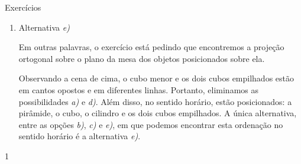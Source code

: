 \clearpage
\def\currentcolor{cor1}
\begin{answer}{Exercícios}
{\exerciselist
\begin{enumerate}
\item Alternativa \textit{e)}

Em outras palavras, o exercício está pedindo que encontremos a projeção ortogonal sobre o plano da mesa dos objetos posicionados sobre ela.

Observando a cena de cima, o cubo menor e os dois cubos empilhados estão em cantos opostos e em diferentes linhas. Portanto, eliminamos as possibilidades \textit{a)} e \textit{d)}. Além disso, no sentido horário, estão posicionados: a pirâmide, o cubo, o cilindro e os dois cubos empilhados. A única alternativa, entre as opções \textit{b)}, \textit{c)} e \textit{e)}, em que podemos encontrar esta ordenação no sentido horário é a alternativa \textit{e)}.
\end{enumerate}
}{1}
\end{answer}
\clearmargin

